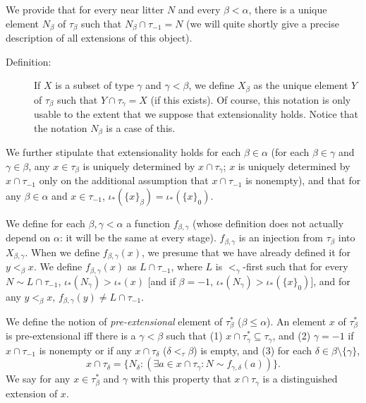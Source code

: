 \documentclass[112pt]{article}
\begin{document}
\begin{description}
We provide that for every near litter $N$ and every $\beta<\alpha$, there is a unique element $N_\beta$ of $\tau_\beta$ such that $N_\beta \cap \tau_{-1}=N$ (we will quite shortly give a precise description of all extensions of this object).

\begin{description}

\item[Definition:]  If $X$ is a subset of type $\gamma$ and $\gamma<\beta$, we define $X_\beta$ as the unique element $Y$ of $\tau_\beta$
such that $Y \cap \tau_\gamma = X$ (if this exists).  Of course, this notation is only usable to the extent that we suppose that extensionality holds.  Notice
that the notation $N_\beta$ is a case of this.

\end{description}

We further stipulate that extensionality holds for each $\beta\in \alpha$ (for each $\beta\in \gamma$ and $\gamma \in \beta$, any $x \in \tau_\beta$ is uniquely determined by $x \cap \tau_\gamma$;  $x$ is uniquely determined by $x \cap \tau_{-1}$ only on the additional assumption that $x \cap \tau_{-1}$ is nonempty), and that for any $\beta \in \alpha$ and $x \in \tau_{-1}$, $\iota_*(\{x\}_\beta) = \iota_*(\{x\}_0)$.

We define for each $\beta,\gamma <\alpha$ a function $f_{\beta,\gamma}$ (whose definition does not actually depend on $\alpha$:  it will be the same at every stage).  $f_{\beta,\gamma}$ is an injection from $\tau_\beta$ into $X_{\beta,\gamma}$.
When we define $f_{\beta,\gamma}(x)$, we presume that we have already defined it for $y <_\beta x$.
We define $f_{\beta,\gamma}(x)$ as $L\cap \tau_{-1}$, where $L$ is $<_\gamma$-first such that for every $N \sim L \cap \tau_{-1}$, $\iota_*(N_\gamma)>\iota_*(x)$ [and if $\beta=-1$, $\iota_*(N_\gamma)>\iota_*(\{x\}_0)$], and for any $y<_\beta x$, $f_{\beta,\gamma}(y) \neq L\cap \tau_{-1}$.

\begin{comment}

Look at Sky's approach

\end{comment}



We define the notion of {\em pre-extensional\/} element of $\tau^*_\beta$ ($\beta \leq \alpha$).   An element $x$ of $\tau^*_\beta$ is pre-extensional iff there is a $\gamma<\beta$ such that (1) $x \cap \tau^*_\gamma \subseteq \tau_\gamma$, and (2) $\gamma=-1$ if
$x \cap \tau_{-1}$ is nonempty or if any $x \cap \tau_\delta$ ($\delta <_\tau \beta$) is empty,  and (3) for each $\delta \in \beta \setminus \{\gamma\}$, $$x \cap \tau_\delta= \{N_\delta:(\exists a \in x \cap \tau_\gamma:N \sim f_{\gamma,\delta}(a))\}.$$  We say for any $x \in \tau^*_\beta$ and $\gamma$ with this property that $x \cap \tau_\gamma$ is a distinguished extension of $x$.


\end{description}
\end{document}
